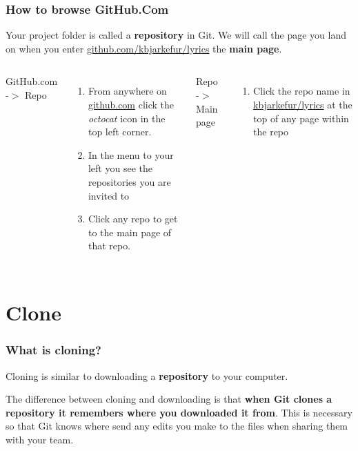 \documentclass[aspectratio=169]{beamer} %
\newcommand{\trainingURL}[1]{{\color{blue}\url{#1}}}
\newcommand{\traininerUsername}{kbjarkefur}
\newcommand{\repoName}{\traininerUsername/lyrics}
\newcommand{\trainingRepoURL}[1]{\trainingURL{github.com/\repoName #1}}
\begin{document}
\begin{frame}
\frametitle{How to browse GitHub.Com}

	Your project folder is called a \textbf{repository} in Git. We will call the page you land on when you enter \trainingRepoURL{} the \textbf{main page}.

	\vspace{.5cm}

	\begin{columns}[T]

		GitHub.com -$>$ Repo
		\begin{enumerate}
			\item From anywhere on \trainingURL{github.com} click the \textit{octocat} icon in the top left corner.
			\item In the menu to your left you see the repositories you are invited to
			\item Click any repo to get to the main page of that repo.
		\end{enumerate}

		Repo -$>$ Main page
		\begin{enumerate}
			\item Click the repo name in {\color{blue}\url{\repoName}} at the top of any page within the repo
		\end{enumerate}

	\end{columns}
\end{frame}

\section{Clone}

\begin{frame}
\frametitle{What is cloning?}

	Cloning is similar to downloading a \textbf{repository} to your computer.

	\vspace{.5cm}

	The difference between cloning and downloading is that \textbf{when Git clones a repository it remembers where you downloaded it from}. This is necessary so that Git knows where send any edits you make to the files when sharing them with your team.

\end{frame}
\end{document}
